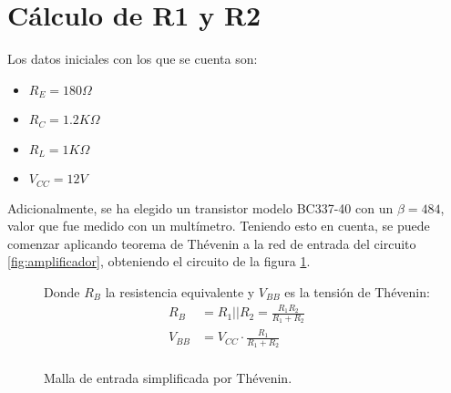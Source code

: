\section{Cálculo de R1 y R2}
    Los datos iniciales con los que se cuenta son:
    \begin{itemize}
        \item $R_E = 180\Omega$
        \item $R_C = 1.2K\Omega$
        \item $R_L = 1K\Omega$
        \item $V_{CC} = 12V$
    \end{itemize}
    Adicionalmente, se ha elegido un transistor modelo BC337-40 con un $\beta = 484$, valor que fue medido con un
    multímetro.
    Teniendo esto en cuenta, se puede comenzar aplicando teorema de Thévenin a la red de entrada del circuito
    \ref{fig:amplificador}, obteniendo el circuito de la figura \ref{fig:malla-entrada}.
    
    \begin{figure}[!ht]
        \centering
        \begin{minipage}{0.4\textwidth}
            \centering
            \caption{Malla de entrada simplificada por Thévenin.}
            \label{fig:malla-entrada}
        \end{minipage}%
        \begin{minipage}{0.4\textwidth}
            \centering
            Donde $R_{B}$ la resistencia equivalente y $V_{BB}$ es la tensión de Thévenin:
            \begin{align*}
                R_{B} &= R_1||R_2=\frac{R_1 R_2}{R_1 + R_2} \\
                V_{BB} &= V_{CC} \cdot \frac{R_1}{R_1 + R_2} \\
            \end{align*}
        \end{minipage}
    \end{figure}

